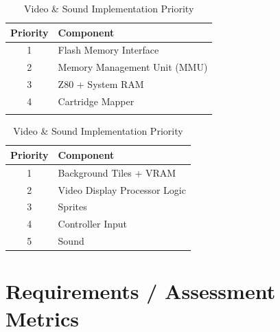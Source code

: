 \documentclass{article}
\begin{document}
\begin{table}[H]
    \parbox{.45\linewidth}{
    \begin{tabular}{cl}
        \toprule
        \textbf{Priority} & \textbf{Component} \\
        \midrule
        1 & Flash Memory Interface \\
        2 & Memory Management Unit (MMU) \\
        3 & Z80 + System RAM \\
        4 & Cartridge Mapper \\
          &\\
        \bottomrule
    \end{tabular}
    \caption{CPU \& Memory Implementation Priority}
}
\hfill
\parbox{.45\linewidth}{
    \begin{tabular}{cl}
        \toprule
        \textbf{Priority} & \textbf{Component} \\
        \midrule
        1 & Background Tiles + VRAM \\
        2 & Video Display Processor Logic \\
        3 & Sprites \\
        4 & Controller Input \\
        5 & Sound \\
        \bottomrule
    \end{tabular}
    \caption{Video \& Sound Implementation Priority}
}
\end{table}

\section{Requirements / Assessment Metrics}
\end{document}
